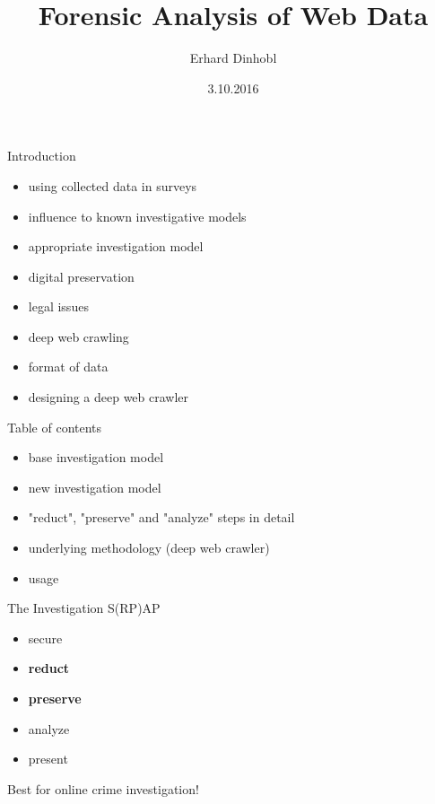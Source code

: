 \documentclass{beamer}
\title[]{Forensic Analysis of Web Data}
\author{Erhard Dinhobl}
\institute{Vienna University of Technology - Information and Software Engineering Group}
\date{3.10.2016}
\begin{document}
\begin{frame}
  \titlepage
\end{frame}


\begin{frame}{Introduction}

\begin{itemize}
  \item using collected data in surveys
  \item influence to known investigative models
  \item appropriate investigation model
  \item digital preservation
  \item legal issues
  \item deep web crawling
  \item format of data
  \item designing a deep web crawler
\end{itemize}

\end{frame}

\begin{frame}{Table of contents}

\begin{itemize}
  \item base investigation model
  \item new investigation model
  \item "reduct", "preserve" and "analyze" steps in detail
  \item underlying methodology (deep web crawler)
  \item usage
\end{itemize}
\end{frame}


\begin{frame}{The Investigation S(RP)AP}
\begin{itemize}
  \item secure
  \item \textbf{reduct}
  \item \textbf{preserve}
  \item analyze
  \item present
\end{itemize}

Best for online crime investigation!

\end{frame}
\end{document}
